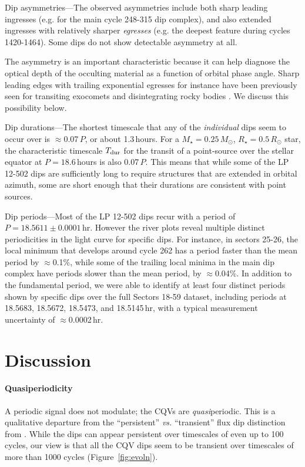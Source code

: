 \documentclass[11pt,twocolumn,tighten]{aastex63}
\begin{document}
{\sc Dip asymmetries}---The observed asymmetries include both sharp
leading ingresses (e.g. for the main cycle 248-315 dip complex), and
also extended ingresses with relatively sharper {\it egresses} (e.g.
the deepest feature during cycles 1420-1464).  Some dips do not show
detectable asymmetry at all.

The asymmetry is an important characteristic because it can help
diagnose the optical depth of the occulting material as a function of
orbital phase angle.  Sharp leading edges with trailing exponential
egresses for instance have been previously seen for transiting
exocomets and disintegrating rocky bodies
\citep[e.g.][]{2012ApJ...752....1R,2012A&A...545L...5B,2015Natur.526..546V,2019A&A...625L..13Z}.
We discuss this possibility below.


{\sc Dip durations}---The shortest timescale that any of the {\it
individual} dips seem to occur over is $\approx$0.07\,$P$, or about
1.3\,hours.  For a $M_\star=0.25\,M_\odot$, $R_\star=0.5\,R_\odot$
star, the characteristic timescale $T_{\rm dur}$ for the transit of a
point-source over the stellar equator at $P=18.6\,$hours is also
0.07\,$P$.  This means that while some of the LP 12-502 dips are
sufficiently long to require structures that are extended in orbital
azimuth, some are short enough that their durations are consistent
with point sources.

{\sc Dip periods}---Most of the LP 12-502 dips recur with a period of
$P=18.5611 \pm 0.0001$\,hr.  However the river plots reveal multiple
distinct periodicities in the light curve for specific dips.  For
instance, in sectors 25-26, the local minimum that develops around
cycle 262 has a period faster than the mean period by $\approx$0.1\%,
while some of the trailing local minima in the main dip complex have
periods slower than the mean period, by $\approx$0.04\%.  In addition
to the fundamental period, we were able to identify at least four
distinct periods shown by specific dips over the full Sectors 18-59
dataset, including periods at 18.5683, 18.5672, 18.5473, and
18.5145\,hr, with a typical measurement uncertainty of
$\approx$0.0002\,hr.




\section{Discussion}
\label{sec:discussion}

\paragraph{Quasiperiodicity}
A periodic signal does not modulate; the CQVs are {\it quasi}periodic.
This is a qualitative departure from
the ``persistent'' {\it vs.} ``transient'' flux dip distinction from 
\citet{2017AJ....153..152S}.  While the dips can appear persistent
over timescales of even up to 100 cycles, our view is that all the CQV
dips seem to be transient over timescales of more than 1000 cycles
(Figure~\ref{fig:evoln}).
\end{document}
